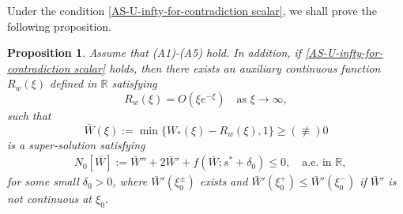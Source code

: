 \documentclass[11pt,a4paper]{article}
\newtheorem{proposition}[theorem]{\textbf{Proposition}}
\numberwithin{equation}{section}
\numberwithin{figure}{section}
\newcommand{\blue}[1]{{\color{blue}#1}}
\newcommand\bea{\begin{eqnarray}}
\newcommand\eea{\end{eqnarray}}
\newcommand\beaa{\begin{eqnarray*}}
\newcommand\eeaa{\end{eqnarray*}}
\begin{document}


Under the condition \eqref{AS-U-infty-for-contradiction scalar},
we shall prove the following proposition.

\begin{proposition}\label{Prop-supersol}
Assume that (A1)-(A5) hold. In addition, if \eqref{AS-U-infty-for-contradiction scalar} holds,
then there exists an auxiliary continuous function $R_w(\xi)$ defined in $\mathbb{R}$ satisfying
\begin{equation}\label{decay rate of Rw}
R_w(\xi)=O(\xi e^{-\xi}) \quad \mbox{as $\xi\to\infty$},
\end{equation}
such that 
$$\bar{W}(\xi):=\min\{W_{*}(\xi)-R_w(\xi),1\}\geq (\not\equiv) 0$$
is a super-solution
satisfying
\bea\label{tw super solution scalar}
&N_0[\bar W]:=\bar W''+2\bar W'+f(\bar W;s^*+\delta_0)\le0,\quad  \mbox{a.e. in $\mathbb{R}$},
\eea
for some small $\delta_0>0$,
where ${\bar W}'(\xi_0^{\pm})$ exists and
${\bar W}'(\xi_0^+)\leq {\bar W}'(\xi_0^-)$
if $\bar W'$ is not continuous at $\xi_0$.

\end{proposition}
\end{document}
